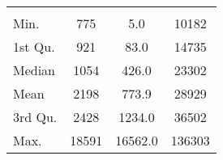 \begin{tabular}{lS[table-format=5.1]S[table-format=5.1]S[table-format=5.1]}
&  &  &  \\
 Min.    & 775 & 5.0 & 10182 \\
 1st Qu. & 921 & 83.0 & 14735 \\
 Median  & 1054 & 426.0 & 23302 \\
 Mean    & 2198 & 773.9 & 28929 \\
 3rd Qu. & 2428 & 1234.0 & 36502 \\
 Max.    & 18591 & 16562.0 & 136303 \\
\end{tabular}
